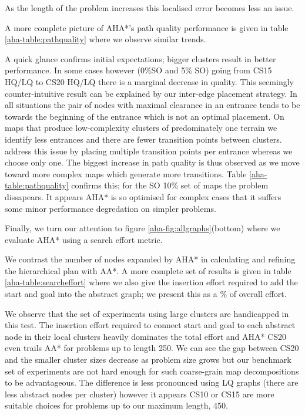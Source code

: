 As the length of the problem increases this localised error becomes less an issue.
\par \indent
A more complete picture of AHA*'s path quality performance is given in table \ref{aha-table:pathquality} where we observe similar trends. 

A quick glance confirms initial expectations; bigger clusters result in better performance. 
In some cases however (0\%SO and 5\% SO) going from CS15 HQ/LQ to CS20 HQ/LQ there is a marginal decrease in quality. 
This seemingly counter-intuitive result can be explained by our inter-edge placement strategy. 
In all situations the pair of nodes with maximal clearance in an entrance tends to be towards the beginning of the entrance which is not an optimal placement. 
On maps that produce low-complexity clusters of predominately one terrain we identify less entrances and there are fewer transition points between clusters. 
\cite{botea04} address this issue by placing multiple transition points per entrance whereas we choose only one. 
The biggest increase in path quality is thus observed as we move toward more complex maps which generate more transitions. 
Table \ref{aha-table:pathquality} confirms this; for the SO 10\% set of maps the problem dissapears. 
It appears AHA* is so optimised for complex cases that it suffers some minor performance degredation on simpler problems. 
\par \indent
Finally, we turn our attention to figure \ref{aha-fig:allgraphs}(bottom) where we evaluate AHA* using a search effort metric. 

We contrast the number of nodes expanded by AHA* in calculating and refining the hierarchical plan with AA*. 
A more complete set of results is given in table \ref{aha-table:searcheffort} where we also give the insertion effort required to add the start and goal into the abstract graph; we present this as a \% of overall effort.
\par \indent
We observe that the set of experiments using large clusters are handicapped in this test. 
The insertion effort required to connect start and goal to each abstract node in their local clusters heavily dominates the total effort and AHA* CS20 even trails AA* for problems up to length 250. 
We can see the gap between CS20 and the smaller cluster sizes decrease as problem size grows but our benchmark set of experiments are not hard enough for such coarse-grain map decompositions to be advantageous. 
The difference is less pronounced using LQ graphs (there are less abstract nodes per cluster) however it appears CS10 or CS15 are more suitable choices for problems up to our maximum length, 450.
